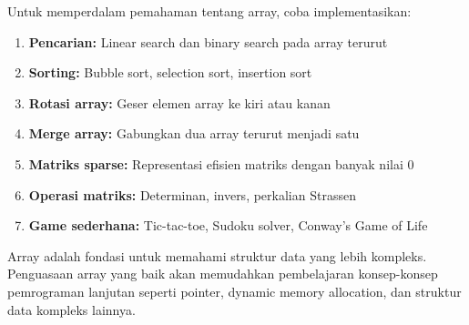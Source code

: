 \documentclass[../main.tex]{subfiles}
\begin{document}
Untuk memperdalam pemahaman tentang array, coba implementasikan:
\begin{enumerate}
  \item \textbf{Pencarian:} Linear search dan binary search pada array terurut
  \item \textbf{Sorting:} Bubble sort, selection sort, insertion sort
  \item \textbf{Rotasi array:} Geser elemen array ke kiri atau kanan
  \item \textbf{Merge array:} Gabungkan dua array terurut menjadi satu
  \item \textbf{Matriks sparse:} Representasi efisien matriks dengan banyak nilai 0
  \item \textbf{Operasi matriks:} Determinan, invers, perkalian Strassen
  \item \textbf{Game sederhana:} Tic-tac-toe, Sudoku solver, Conway's Game of Life
\end{enumerate}

Array adalah fondasi untuk memahami struktur data yang lebih kompleks. Penguasaan array yang baik akan memudahkan pembelajaran konsep-konsep pemrograman lanjutan seperti pointer, dynamic memory allocation, dan struktur data kompleks lainnya.
\end{document}
